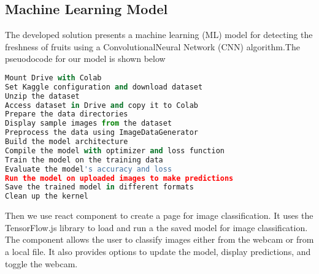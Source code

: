 \subsection{Machine Learning Model}
\noindent The developed solution presents a machine learning (ML) model for detecting the freshness of fruits using a ConvolutionalNeural Network (CNN) algorithm.The pseuodocode for our model is shown below \par
\begin{lstlisting}[language=Python , caption=ML model]
Mount Drive with Colab
Set Kaggle configuration and download dataset
Unzip the dataset
Access dataset in Drive and copy it to Colab
Prepare the data directories
Display sample images from the dataset
Preprocess the data using ImageDataGenerator
Build the model architecture
Compile the model with optimizer and loss function
Train the model on the training data
Evaluate the model's accuracy and loss
Run the model on uploaded images to make predictions
Save the trained model in different formats
Clean up the kernel
\end{lstlisting}
\noindent Then we use react component to create a page for image classification. It uses the TensorFlow.js library to load and run a the saved model for image classification. The component allows the user to classify images either from the webcam or from a local file. It also provides options to update the model, display predictions, and toggle the webcam.
\noindent 








